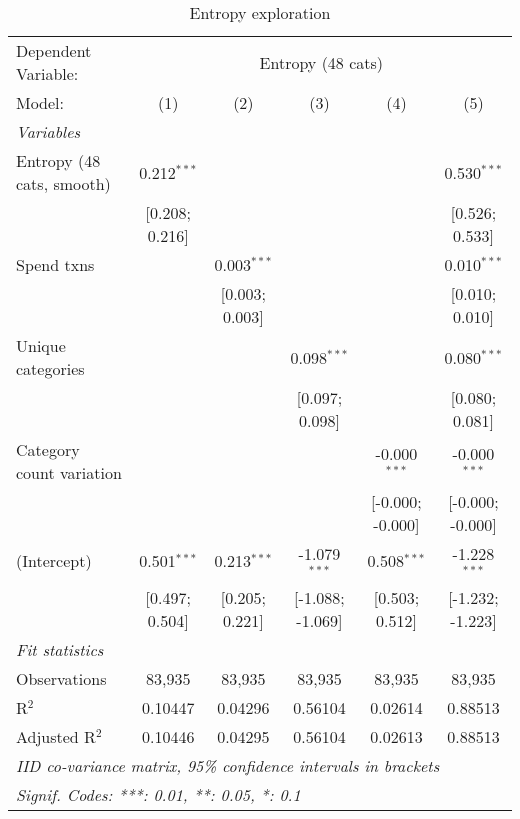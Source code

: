 
\begin{table}[htbp]
   \centering
   \tiny
   \begin{threeparttable}[b]
      \caption{\label{tab:reg_has_sa_inflows_explore} Entropy exploration}
      \begin{tabular}{lccccc}
         \tabularnewline \midrule \midrule
         Dependent Variable: & \multicolumn{5}{c}{Entropy (48 cats)}\\
         Model:                    & (1)            & (2)            & (3)              & (4)              & (5)\\  
         \midrule
         \emph{Variables}\\
         Entropy (48 cats, smooth) & 0.212$^{***}$  &                &                  &                  & 0.530$^{***}$\\   
                                   & [0.208; 0.216] &                &                  &                  & [0.526; 0.533]\\   
         Spend txns                &                & 0.003$^{***}$  &                  &                  & 0.010$^{***}$\\   
                                   &                & [0.003; 0.003] &                  &                  & [0.010; 0.010]\\   
         Unique categories         &                &                & 0.098$^{***}$    &                  & 0.080$^{***}$\\   
                                   &                &                & [0.097; 0.098]   &                  & [0.080; 0.081]\\   
         Category count variation  &                &                &                  & -0.000$^{***}$   & -0.000$^{***}$\\   
                                   &                &                &                  & [-0.000; -0.000] & [-0.000; -0.000]\\   
         (Intercept)               & 0.501$^{***}$  & 0.213$^{***}$  & -1.079$^{***}$   & 0.508$^{***}$    & -1.228$^{***}$\\   
                                   & [0.497; 0.504] & [0.205; 0.221] & [-1.088; -1.069] & [0.503; 0.512]   & [-1.232; -1.223]\\   
         \midrule
         \emph{Fit statistics}\\
         Observations              & 83,935         & 83,935         & 83,935           & 83,935           & 83,935\\  
         R$^2$                     & 0.10447        & 0.04296        & 0.56104          & 0.02614          & 0.88513\\  
         Adjusted R$^2$            & 0.10446        & 0.04295        & 0.56104          & 0.02613          & 0.88513\\  
         \midrule \midrule
         \multicolumn{6}{l}{\emph{IID co-variance matrix, 95\% confidence intervals in brackets}}\\
         \multicolumn{6}{l}{\emph{Signif. Codes: ***: 0.01, **: 0.05, *: 0.1}}\\
      \end{tabular}
      

\end{threeparttable}
\end{table}
